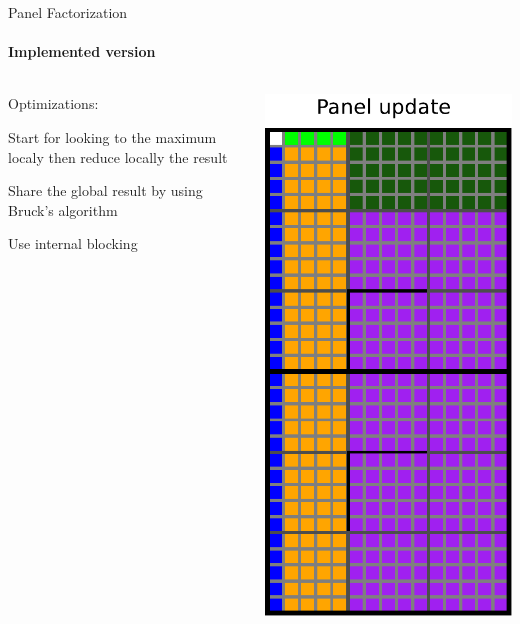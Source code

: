 \begin{frame}{Panel Factorization}
\framesubtitle{Implemented version}
\begin{columns}
\begin{column}{.50\textwidth}
Optimizations:
\begin{itemize}
{
\item Start for looking to the maximum localy then reduce locally the result\item Share the global result by using Bruck's algorithm}
\item Use internal blocking
\end{itemize}
\end{column}
\hfill
\begin{column}{.50\textwidth}
\begin{center}
\includegraphics[scale=0.3]{panel_update.pdf}
\end{center}
\end{column}
\end{columns}
\end{frame}


